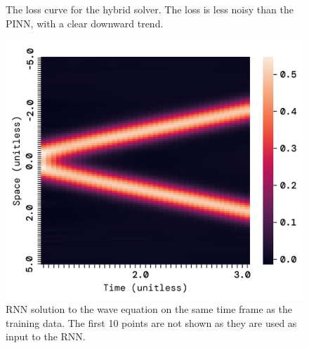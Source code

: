\documentclass[twoside,11pt]{report}
\begin{document}
\begin{figure}[!ht]
\begin{minipage}[t]{0.5\textwidth - 1mm}
\begin{center}
            \end{center}
            \caption
            {
                The loss curve for the hybrid solver. The loss is less noisy than the PINN, with a clear downward trend.
            }\label{fig:wave_tf_dnn}
        \end{minipage}
    \end{figure}
    \begin{figure}[!ht]
        \begin{minipage}[t]{0.5\textwidth - 1mm}
            \begin{center}
                \includegraphics[width=\textwidth]{../runsAndFigures/wave_rnn.png}
            \end{center}
            \caption
            {
                RNN solution to the wave equation on the same time frame as the training data. 
                The first 10 points are not shown as they are used as input to the RNN.
            }\label{fig:wave_own_dnn}
        \end{minipage}
        \hspace{2mm}
        \begin{minipage}[t]{0.5\textwidth - 1mm}
            \begin{center}

\end{center}
\end{minipage}
\end{figure}
\end{document}
